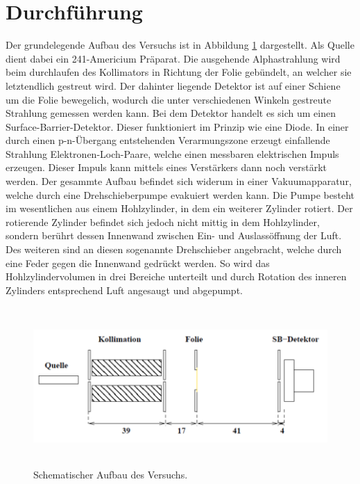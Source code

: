 \section{Durchführung}
\label{sec:Durchführung}

Der grundelegende Aufbau des Versuchs ist in Abbildung \ref{fig:aufbau} dargestellt.
Als Quelle dient dabei ein 241-Americium Präparat. Die ausgehende Alphastrahlung
wird beim durchlaufen des Kollimators in Richtung der Folie gebündelt, an welcher
sie letztendlich gestreut wird. Der dahinter liegende Detektor ist auf einer Schiene
um die Folie bewegelich, wodurch die unter verschiedenen Winkeln gestreute Strahlung
gemessen werden kann. Bei dem Detektor handelt es sich um einen Surface-Barrier-Detektor.
Dieser funktioniert im Prinzip wie eine Diode. In einer durch einen p-n-Übergang
entstehenden Verarmungszone erzeugt einfallende Strahlung Elektronen-Loch-Paare,
welche einen messbaren elektrischen Impuls erzeugen. Dieser Impuls kann mittels eines
Verstärkers dann noch verstärkt werden.
Der gesammte Aufbau befindet sich widerum in einer Vakuumapparatur, welche
durch eine Drehschieberpumpe evakuiert werden kann. Die Pumpe besteht im wesentlichen
aus einem Hohlzylinder, in dem ein weiterer Zylinder rotiert. Der rotierende Zylinder
befindet sich jedoch nicht mittig in dem Hohlzylinder, sondern berührt dessen Innenwand
zwischen Ein- und Auslassöffnung der Luft. Des weiteren sind an diesen sogenannte
Drehschieber angebracht, welche durch eine Feder gegen die Innenwand gedrückt werden.
So wird das Hohlzylindervolumen in drei Bereiche unterteilt und durch Rotation des
inneren Zylinders entsprechend Luft angesaugt und abgepumpt.

\begin{figure}[H]
  \centering
  \includegraphics[height=6cm]{Aufbau.PNG}
  \caption{Schematischer Aufbau des Versuchs. \cite{sample1}}
  \label{fig:aufbau}
\end{figure}

